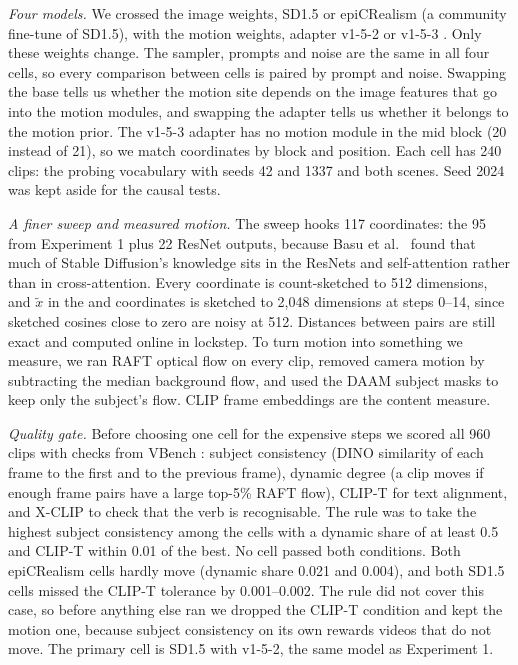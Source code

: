\documentclass[twoside,english]{article}
\newcommand{\xd}{\tilde{x}}       %
\begin{document}
\emph{Four models.} We crossed the image weights, SD1.5 or epiCRealism \citep{hf_epicrealism} (a
community fine-tune of SD1.5), with the motion weights, adapter \mbox{v1-5-2} \citep{hf_animatediff} or
\mbox{v1-5-3} \citep{hf_animatediff_v3}. Only these weights change. The sampler, prompts and noise are the
same in all four cells, so every comparison between cells is paired by prompt and noise. Swapping the
base tells us whether the motion site depends on the image features that go into the motion modules,
and swapping the adapter tells us whether it belongs to the motion prior. The \mbox{v1-5-3} adapter has no
motion module in the mid block (20 instead of 21), so we match coordinates by block and position. Each
cell has 240 clips: the probing vocabulary with seeds 42 and 1337 and both scenes. Seed 2024 was kept
aside for the causal tests.

\emph{A finer sweep and measured motion.} The sweep hooks 117 coordinates: the 95 from Experiment 1 plus
22 ResNet outputs, because Basu et al.\ \citep{basu2024localizing} found that much of Stable Diffusion's
knowledge sits in the ResNets and self-attention rather than in cross-attention. Every coordinate is
count-sketched to 512 dimensions, and $\xd$ in the  and  coordinates is
sketched to 2{,}048 dimensions at steps 0--14, since sketched cosines close to zero are noisy at 512.
Distances between pairs are still exact and computed online in lockstep. To turn motion into something
we measure, we ran RAFT optical flow \citep{teed2020raft} on every clip, removed camera motion by
subtracting the median background flow, and used the DAAM subject masks to keep only the subject's flow.
CLIP frame embeddings are the content measure.

\emph{Quality gate.} Before choosing one cell for the expensive steps we scored all 960 clips with checks
from VBench \citep{huang2024vbench}: subject consistency (DINO \citep{caron2021dino} similarity of each
frame to the first and to the previous frame), dynamic degree (a clip moves if enough frame pairs have a
large top-5\% RAFT flow), CLIP-T for text alignment, and X-CLIP \citep{ni2022xclip} to check that the verb
is recognisable. The rule was to take the highest subject consistency among the cells with a dynamic
share of at least 0.5 and CLIP-T within 0.01 of the best. No cell passed both conditions. Both epiCRealism
cells hardly move (dynamic share 0.021 and 0.004), and both SD1.5 cells missed the CLIP-T tolerance by
0.001--0.002. The rule did not cover this case, so before anything else ran we dropped the CLIP-T
condition and kept the motion one, because subject consistency on its own rewards videos that do not
move. The primary cell is SD1.5 with \mbox{v1-5-2}, the same model as Experiment 1.
\end{document}
